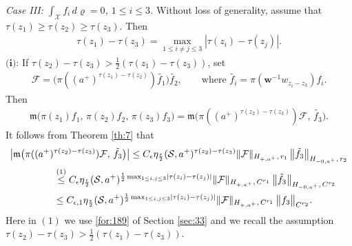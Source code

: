 \documentclass[11 pt]{amsart}
\newcommand{\norm}[1]{\lVert#1\rVert}
\newcommand{\abs}[1]{\lvert#1\rvert}
\theoremstyle{definition}
\numberwithin{equation}{section}
\begin{document}
\smallskip
\emph{Case III: $\int_{\mathcal{X}} f_i \, d\varrho=0$, $1\leq i\leq 3$.} Without loss of generality, assume that $\tau(z_1)\geq \tau(z_2)\geq \tau(z_3)$. Then
\begin{align}\label{for:3}
 \tau(z_1)-\tau(z_3)=\max_{1\leq i\neq j\leq 3}|\tau(z_i)-\tau(z_j)|.
\end{align}
$\textbf{(i)}$: If $\tau(z_{2})-\tau(z_{3})>\frac{1}{2}(\tau(z_1)-\tau(z_3))$, set
\begin{align*}
\mathcal{F}= \big(\pi((a^+)^{\tau(z_1)-\tau(z_2)})\tilde{f_1}\big) \tilde{f_2},\qquad \text{where }\tilde{f_i}=\pi(\textbf{w}^{-1}w_{z_i-z_3})f_i.
\end{align*}
Then
\begin{align}\label{for:343}
 \mathfrak{m}\big(\pi(z_1)f_1,\,\pi(z_2)f_2,\, \pi(z_3)f_{3}\big)=\mathfrak{m}\big(\pi((a^+)^{\tau(z_2)-\tau(z_3)})\mathcal{F},\,\tilde{f_{3}}\big).
\end{align}
It follows from Theorem \ref{th:7} that
\begin{align}\label{for:344}
 \big|\mathfrak{m}\big(\pi((a^+)&^{\tau(z_2)-\tau(z_3)})\mathcal{F},\,\tilde{f_{3}}\big)\big|\leq C_\epsilon \eta_{\frac{\epsilon}{2}}(\mathcal{S}, a^+)^{\tau(z_2)-\tau(z_3)}\norm{\mathcal{F}}_{H_{+,a^+},\,r_1}\,\big\|\tilde{f_{3}}\big\|_{H_{-0,a^+},\,r_2}\notag\\
 &\overset{\text{(1)}}{\leq} C_{\epsilon}\eta_{\frac{\epsilon}{2}}(\mathcal{S}, a^+)^{\frac{1}{2}\max_{1\leq i,j\leq 3}\abs{\tau(z_i)-\tau(z_j)}}\norm{\mathcal{F}}_{H_{+,a^+},\,C^{r_1}}\,\big\|\tilde{f_{3}}\big\|_{H_{-0,a^+},\,C^{r_2}}\notag\\
 &\leq C_{\epsilon,1}\eta_{\frac{\epsilon}{2}}(\mathcal{S}, a^+)^{\frac{1}{2}\max_{1\leq i,j\leq 3}\abs{\tau(z_i)-\tau(z_j)}}\norm{\mathcal{F}}_{H_{+,a^+},\,C^{r_1}}\,\big\|f_{3}\big\|_{C^{r_2}}.
\end{align}
Here in $(1)$ we use \eqref{for:189} of Section \ref{sec:33} and  we recall the assumption $\tau(z_{2})-\tau(z_{3})>\frac{1}{2}(\tau(z_1)-\tau(z_3))$.
\end{document}
